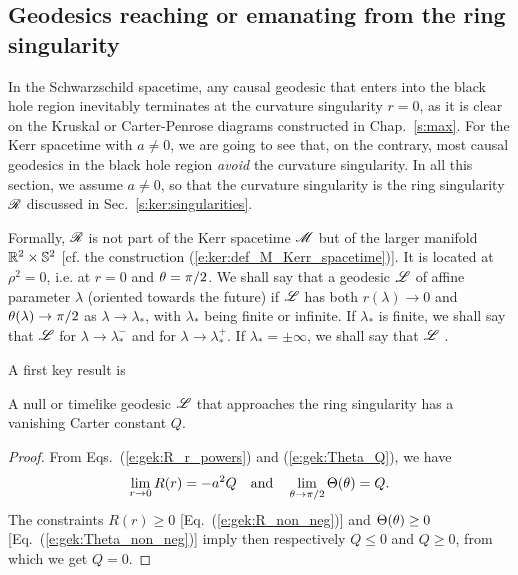 \subsection{Geodesics reaching or emanating from the ring singularity}

In the Schwarzschild spacetime, any causal geodesic that enters into the black
hole region inevitably terminates at the curvature singularity $r=0$, as it
is clear on the Kruskal or Carter-Penrose diagrams constructed in Chap.~\ref{s:max}.
For the Kerr spacetime with $a\neq 0$, we are going to see that, on the contrary,
most causal geodesics in the black hole region \emph{avoid} the curvature
singularity. In all this section, we assume $a\neq 0$, so that the
curvature singularity is the ring singularity $\mathscr{R}$
discussed in Sec.~\ref{s:ker:singularities}.

Formally, $\mathscr{R}$ is not
part of the Kerr spacetime $\mathscr{M}$ but of the larger manifold $\mathbb{R}^2\times\mathbb{S}^2$
[cf. the construction (\ref{e:ker:def_M_Kerr_spacetime})]. It is located
at $\rho^2 = 0$, i.e. at $r=0$ and
$\theta=\pi/2$. We shall say that a
geodesic $\mathscr{L}$ of affine parameter $\lambda$ (oriented towards the future)
if $\mathscr{L}$ has both
$r(\lambda)\to 0$ and $\theta(\lambda) \to \pi/2$ as $\lambda\to\lambda_*$, with
$\lambda_*$ being finite or infinite. If $\lambda_*$ is finite, we shall say
that $\mathscr{L}$ 
for $\lambda\to\lambda_*^-$ and
for $\lambda\to\lambda_*^+$. If $\lambda_*=\pm\infty$, we shall say
that $\mathscr{L}$ .

A first key result is
\begin{prop}
A null or timelike geodesic $\mathscr{L}$ that approaches the ring singularity has
a vanishing Carter constant $Q$.
\end{prop}
\begin{proof}
From Eqs.~(\ref{e:gek:R_r_powers}) and (\ref{e:gek:Theta_Q}), we have
\[
 \lim_{r\to 0} R(r) = - a^2 Q \quad\mbox{and}\quad
 \lim_{\theta\to \pi/2} \Theta(\theta) = Q .
\]
The constraints $R(r) \geq 0$ [Eq.~(\ref{e:gek:R_non_neg})]
and $\Theta(\theta)\geq 0$ [Eq.~(\ref{e:gek:Theta_non_neg})] imply then respectively
$Q \leq 0$ and $Q\geq 0$, from which we get $Q=0$.
\end{proof}

